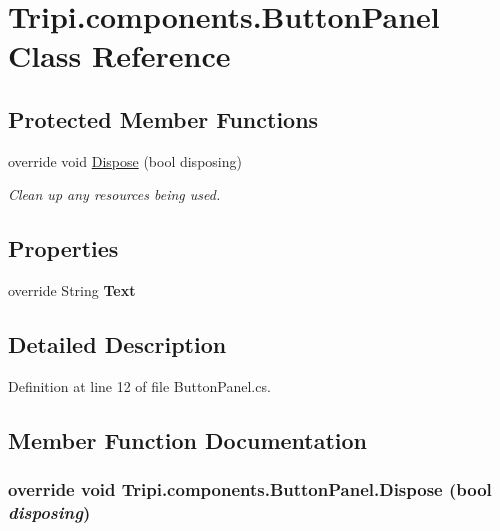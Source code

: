 \hypertarget{class_tripi_1_1components_1_1_button_panel}{
\section{Tripi.components.ButtonPanel Class Reference}
\label{class_tripi_1_1components_1_1_button_panel}
}
\subsection*{Protected Member Functions}
\begin{DoxyCompactItemize}
\item 
override void \hyperlink{class_tripi_1_1components_1_1_button_panel_aea732fe4e23630ae2ee30977aae445ea}{Dispose} (bool disposing)
\begin{DoxyCompactList}\small\item\em Clean up any resources being used. \item\end{DoxyCompactList}\end{DoxyCompactItemize}
\subsection*{Properties}
\begin{DoxyCompactItemize}
\item 
\hypertarget{class_tripi_1_1components_1_1_button_panel_a5c63aa5a33dfa6c2926de247894d1ff0}{
override String {\bfseries Text}}
\label{class_tripi_1_1components_1_1_button_panel_a5c63aa5a33dfa6c2926de247894d1ff0}

\end{DoxyCompactItemize}


\subsection{Detailed Description}


Definition at line 12 of file ButtonPanel.cs.

\subsection{Member Function Documentation}
\hypertarget{class_tripi_1_1components_1_1_button_panel_aea732fe4e23630ae2ee30977aae445ea}{
\subsubsection[{Dispose}]{\setlength{\rightskip}{0pt plus 5cm}override void Tripi.components.ButtonPanel.Dispose (bool {\em disposing})}}
\label{class_tripi_1_1components_1_1_button_panel_aea732fe4e23630ae2ee30977aae445ea}


